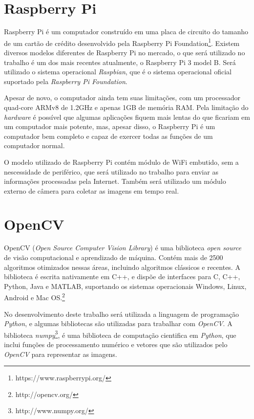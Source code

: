 \section{Raspberry Pi}
\label{sec:raspi}

Raspberry Pi é um computador construído em uma placa de circuito do tamanho de
um cartão de crédito desenvolvido pela Raspberry Pi
Foundation\footnote{https://www.raspberrypi.org/}. Existem diversos modelos
diferentes de Raspberry Pi no mercado, o que será utilizado no trabalho é um dos
mais recentes atualmente, o Raspberry Pi 3 model B. Será utilizado o sistema
operacional \emph{Raspbian}, que é o sistema operacional oficial suportado pela
\emph{Raspberry Pi Foundation}.

Apesar de novo, o computador ainda tem suas limitações, com um processador
quad-core ARMv8 de 1.2GHz e apenas 1GB de memória RAM. Pela limitação do
\emph{hardware} é possível que algumas aplicações fiquem mais lentas do que
ficariam em um computador mais potente, mas, apesar disso, o Raspberry Pi é um
computador bem completo e capaz de exercer todas as funções de um computador
normal.

O modelo utilizado de Raspberry Pi contém módulo de WiFi embutido, sem a
nescessidade de periférico, que será utilizado no trabalho para enviar as
informações processadas pela Internet. Também será utilizado um módulo externo
de câmera para coletar as imagens em tempo real.

\section{OpenCV}
\label{sec:opencv}

OpenCV (\emph{Open Source Computer Vision Library}) é uma biblioteca \emph{open
source} de visão computacional e aprendizado de máquina. Contém mais de 2500
algoritmos otimizados nessas áreas, incluindo algoritmos clássicos e recentes. A
biblioteca é escrita nativamente em C++, e dispõe de interfaces para C, C++,
Python, Java e MATLAB, suportando os sistemas operacionais Windows, Linux,
Android e Mac OS.\footnote{http://opencv.org/}

No desenvolvimento deste trabalho será utilizada a linguagem de programação \emph{Python},
e algumas bibliotecas são utilizadas para trabalhar com \emph{OpenCV}. A biblioteca
\emph{numpy}\footnote{http://www.numpy.org/}, é uma biblioteca de computação cientifica em
\emph{Python}, que inclui funções de processamento numérico e vetores que são utilizados
pelo \emph{OpenCV} para representar as imagens.

